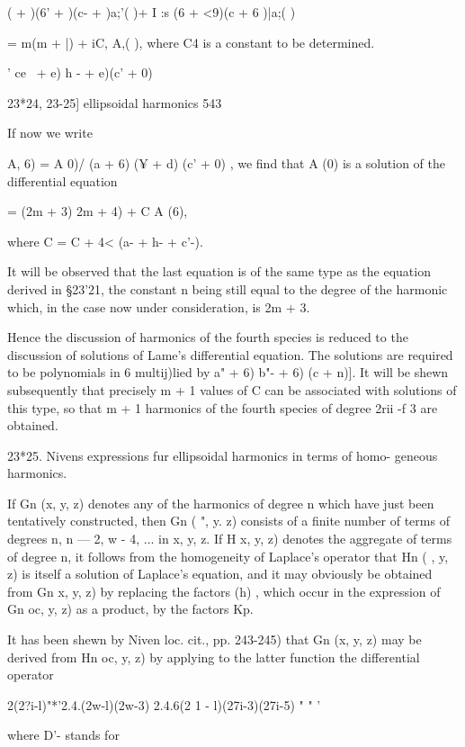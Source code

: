 {(   +  )(6' + )(c-  +  )a;'( )+   I :s (6  + <9)(c  + 6 )|a;( ) 

=  m(m + |)  + iC, A,( ), 
where C4 is a constant to be determined. 



 '   ce~ + e) h - + e)(c' + 0) ~ 



23*24, 23-25] ellipsoidal harmonics 543 

If now we write 

A,  6) = A  0)/  (a  + 6) (¥ + d) (c' + 0) , 
we find that A (0) is a solution of the differential equation 

=  (2m + 3)  2m + 4)   + C  A (6), 

where C = C  + 4< (a- + h- + c'-). 

It will be observed that the last equation is of the same type as the 
equation derived in §23'21, the constant n being still equal to the degree 
of the harmonic which, in the case now under consideration, is 2m + 3. 

Hence the discussion of harmonics of the fourth species is reduced to the 
discussion of solutions of Lame's differential equation. The solutions are 
required to be polynomials in 6 multij)lied by \/  a" + 6)  b"- + 6) (c  + n)]. It 
will be shewn subsequently that precisely m + 1 values of C can be associated 
with solutions of this type, so that m + 1 harmonics of the fourth species of 
degree 2rii -f 3 are obtained. 

23*25. Nivens expressions fur ellipsoidal harmonics in terms of homo- 
geneous harmonics. 

If Gn (x, y, z) denotes any of the harmonics of degree n which have just 
been tentatively constructed, then Gn ( ", y. z) consists of a finite number of 
terms of degrees n, n — 2, w - 4, ... in x, y, z. If H   x, y, z) denotes the 
aggregate of terms of degree n, it follows from the homogeneity of Laplace's 
operator that Hn ( , y, z) is itself a solution of Laplace's equation, and it may 
obviously be obtained from Gn  x, y, z) by replacing the factors (h) , which 
occur in the expression of Gn  oc, y, z) as a product, by the factors Kp. 

It has been shewn by Niven  loc. cit., pp. 243-245) that Gn (x, y, z) may 
be derived from Hn  oc, y, z) by applying to the latter function the differential 
operator 

2(2?i-l)"*'2.4.(2w-l)(2w-3) 2.4.6(2 1 - l)(27i-3)(27i-5) "  "  ' 

where D'- stands for 

}
